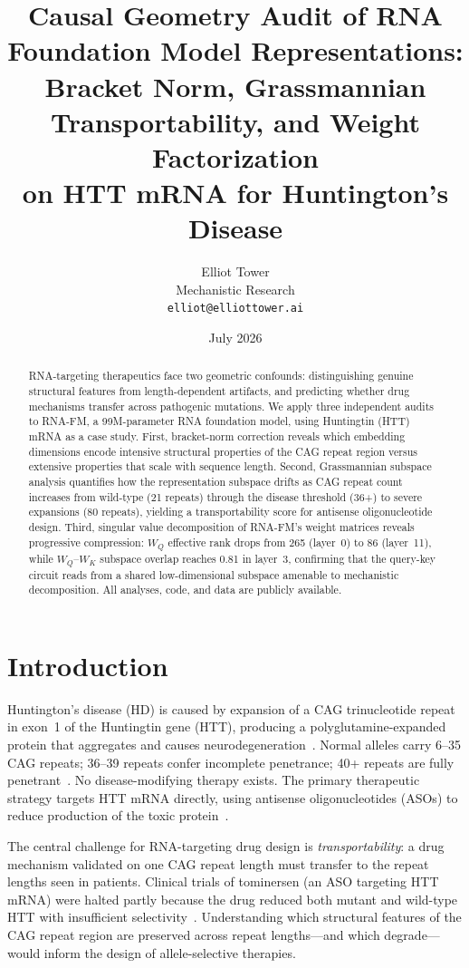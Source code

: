 \documentclass[11pt]{article}
\title{Causal Geometry Audit of RNA Foundation Model Representations:\\
  Bracket Norm, Grassmannian Transportability, and Weight Factorization\\
  on HTT mRNA for Huntington's Disease}
\author{Elliot Tower\\
  Mechanistic Research\\
  \texttt{elliot@elliottower.ai}}
\date{July 2026}
\begin{document}
\maketitle

\begin{abstract}
RNA-targeting therapeutics face two geometric confounds: distinguishing
genuine structural features from length-dependent artifacts, and
predicting whether drug mechanisms transfer across pathogenic mutations.
We apply three independent audits to RNA-FM, a 99M-parameter RNA
foundation model, using Huntingtin (HTT) mRNA as a case study.
%
First, bracket-norm correction reveals which embedding dimensions encode
intensive structural properties of the CAG repeat region versus
extensive properties that scale with sequence length.
%
Second, Grassmannian subspace analysis quantifies how the
representation subspace drifts as CAG repeat count increases from
wild-type (21 repeats) through the disease threshold (36+) to severe
expansions (80 repeats), yielding a transportability score for
antisense oligonucleotide design.
%
Third, singular value decomposition of RNA-FM's weight matrices reveals
progressive compression: $W_Q$ effective rank drops from 265 (layer~0)
to 86 (layer~11), while $W_Q$--$W_K$ subspace overlap reaches 0.81 in
layer~3, confirming that the query-key circuit reads from a shared
low-dimensional subspace amenable to mechanistic decomposition.
%
All analyses, code, and data are publicly available.
\end{abstract}

\section{Introduction}
\label{sec:intro}

Huntington's disease (HD) is caused by expansion of a CAG trinucleotide
repeat in exon~1 of the Huntingtin gene (HTT), producing a
polyglutamine-expanded protein that aggregates and causes
neurodegeneration~\citep{macdonald1993}.
Normal alleles carry 6--35 CAG repeats; 36--39 repeats confer incomplete
penetrance; 40+ repeats are fully penetrant~\citep{rubinsztein1996}.
No disease-modifying therapy exists. The primary therapeutic strategy
targets HTT mRNA directly, using antisense oligonucleotides (ASOs) to
reduce production of the toxic protein~\citep{tabrizi2019}.

The central challenge for RNA-targeting drug design is \emph{transportability}:
a drug mechanism validated on one CAG repeat length must transfer to the
repeat lengths seen in patients. Clinical trials of tominersen
(an ASO targeting HTT mRNA) were halted partly because the drug reduced
both mutant and wild-type HTT with insufficient selectivity~\citep{tabrizi2022}.
Understanding which structural features of the CAG repeat region are
preserved across repeat lengths---and which degrade---would inform
the design of allele-selective therapies.
\end{document}

